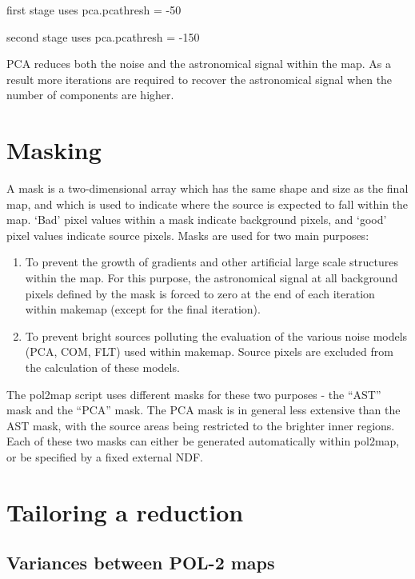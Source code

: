 first stage uses pca.pcathresh = -50

second stage uses pca.pcathresh = -150


PCA reduces both the noise and the astronomical signal within the
map. As a result more iterations are required to recover the
astronomical signal when the number of components are higher.



\section{Masking}
A mask is a two-dimensional array which has the same shape and size as
the final map, and which is used to indicate where the source is
expected to fall within the map. `Bad' pixel values within a mask
indicate background pixels, and `good' pixel values indicate source
pixels. Masks are used for two main purposes:

\begin{enumerate}
\item To prevent the growth of gradients and other artificial large
  scale structures within the map.  For this purpose, the astronomical
  signal at all background pixels defined by the mask is forced to
  zero at the end of each iteration within makemap (except for the
  final iteration).
\item To prevent bright sources polluting the evaluation of the
  various noise models (PCA, COM, FLT) used within makemap. Source
  pixels are excluded from the calculation of these models.
\end{enumerate}


The pol2map script uses different masks for these two purposes - the
“AST” mask and the “PCA” mask.  The PCA mask is in general less
extensive than the AST mask, with the source areas being restricted to
the brighter inner regions.  Each of these two masks can either be
generated automatically within pol2map, or be specified by a fixed
external NDF.



\section{Tailoring a reduction}

\subsection*{Variances between POL-2 maps}


